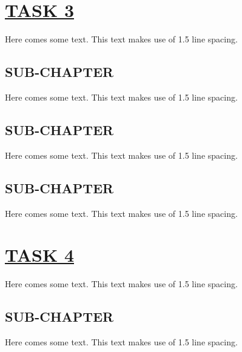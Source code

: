 \documentclass[fontsize=11pt]{scrartcl}
\begin{document}
\section{\uline{TASK 3}}
Here comes some text. This text makes use of 1.5 line spacing. 
\subsection{SUB-CHAPTER}
Here comes some text. This text makes use of 1.5 line spacing. 
\subsection{SUB-CHAPTER}
Here comes some text. This text makes use of 1.5 line spacing. 
\subsection{SUB-CHAPTER}
Here comes some text. This text makes use of 1.5 line spacing. 
\pagebreak
\section{\uline{TASK 4}}
Here comes some text. This text makes use of 1.5 line spacing. 
\subsection{SUB-CHAPTER}
Here comes some text. This text makes use of 1.5 line spacing. 
\end{document}
